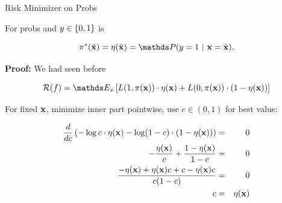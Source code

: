 \documentclass[11pt,compress,t,notes=noshow, xcolor=table]{beamer}
\begin{document}
\begin{vbframe}{Risk Minimizer on Probs}

For probs and $y \in \{0, 1\}$ is

$$
  \piastxtil = \eta(\xtil) = \P(y = 1 ~|~ \xv = \xtil). 
$$

\textbf{Proof:} We had seen before

$$
  \riskf = \E_x \left[L(1, \pix) \cdot \eta(\xv) + L(0, \pix) \cdot (1 - \eta(\xv)) \right]
$$

\vfill


For fixed $\mathbf{x}$, minimize inner part pointwise, use $c\in(0,1)$ for best value:

\begin{footnotesize}
\begin{eqnarray*}
  \frac{d }{d c} \left(- \log c  \cdot \eta(\mathbf{x})- \log (1 - c) \cdot (1 - \eta(\mathbf{x}))\right) &=& 0 \\
  - \frac{\eta(\mathbf{x})}{c} + \frac{1 - \eta(\mathbf{x})}{1 - c} &=& 0 \\
  \frac{- \eta(\mathbf{x}) + \eta(\mathbf{x}) c + c - \eta(\mathbf{x}) c}{c (1 - c)} &=& 0 \\
  c &=& \eta(\mathbf{x})
\end{eqnarray*}
\end{footnotesize}

\end{vbframe}
\end{document}
